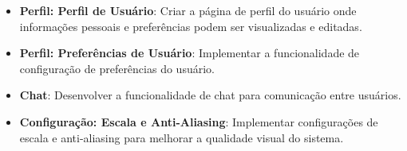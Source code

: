 \documentclass[../main.tex]{subfiles}
\begin{document}
\begin{itemize}
    \item \textbf{Perfil: Perfil de Usuário}: Criar a página de perfil do usuário onde informações pessoais e preferências podem ser visualizadas e editadas.
    \item \textbf{Perfil: Preferências de Usuário}: Implementar a funcionalidade de configuração de preferências do usuário.
    \item \textbf{Chat}: Desenvolver a funcionalidade de chat para comunicação entre usuários.
    \item \textbf{Configuração: Escala e Anti-Aliasing}: Implementar configurações de escala e anti-aliasing para melhorar a qualidade visual do sistema.
\end{itemize}

\end{document}
